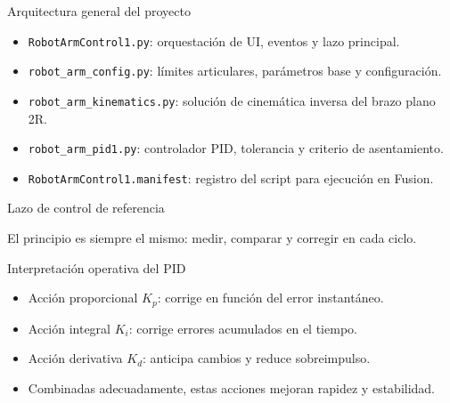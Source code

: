 \documentclass[aspectratio=169]{beamer}
\begin{document}
\begin{frame}{Arquitectura general del proyecto}
\begin{itemize}
  \item \texttt{RobotArmControl1.py}: orquestación de UI, eventos y lazo principal.
  \item \texttt{robot\_arm\_config.py}: límites articulares, parámetros base y configuración.
  \item \texttt{robot\_arm\_kinematics.py}: solución de cinemática inversa del brazo plano 2R.
  \item \texttt{robot\_arm\_pid1.py}: controlador PID, tolerancia y criterio de asentamiento.
  \item \texttt{RobotArmControl1.manifest}: registro del script para ejecución en Fusion.
\end{itemize}
\end{frame}

\begin{frame}{Lazo de control de referencia}
\centering
{}

\vspace{0.5em}
\small{El principio es siempre el mismo: medir, comparar y corregir en cada ciclo.}
\end{frame}

\begin{frame}{Interpretación operativa del PID}
\begin{itemize}
  \item Acción proporcional $K_p$: corrige en función del error instantáneo.
  \item Acción integral $K_i$: corrige errores acumulados en el tiempo.
  \item Acción derivativa $K_d$: anticipa cambios y reduce sobreimpulso.
  \item Combinadas adecuadamente, estas acciones mejoran rapidez y estabilidad.
\end{itemize}
\end{frame}
\end{document}
